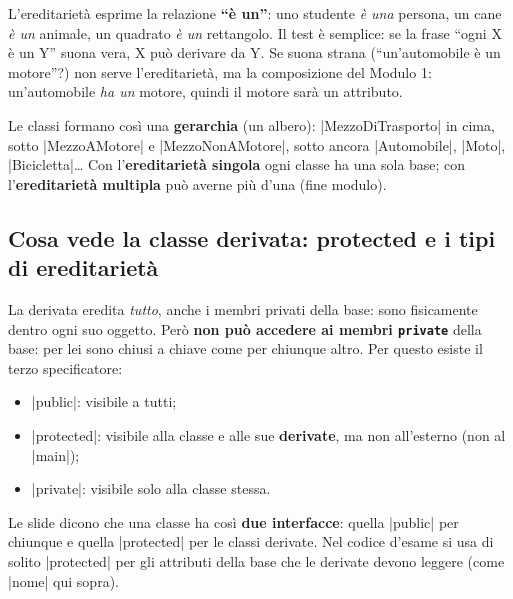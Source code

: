 \begin{analogia}[: la relazione ``è un'']
L'ereditarietà esprime la relazione \textbf{``è un''}: uno studente \emph{è una}
persona, un cane \emph{è un} animale, un quadrato \emph{è un} rettangolo. Il test
è semplice: se la frase ``ogni X è un Y'' suona vera, X può derivare da Y. Se suona
strana (``un'automobile è un motore''?) non serve l'ereditarietà, ma la composizione
del Modulo 1: un'automobile \emph{ha un} motore, quindi il motore sarà un attributo.
\end{analogia}

Le classi formano così una \textbf{gerarchia} (un albero): \cc|MezzoDiTrasporto| in
cima, sotto \cc|MezzoAMotore| e \cc|MezzoNonAMotore|, sotto ancora \cc|Automobile|,
\cc|Moto|, \cc|Bicicletta|\ldots{} Con l'\textbf{ereditarietà singola} ogni classe ha
una sola base; con l'\textbf{ereditarietà multipla} può averne più d'una (fine modulo).

\subsection*{Cosa vede la classe derivata: protected e i tipi di ereditarietà}

La derivata eredita \emph{tutto}, anche i membri privati della base: sono fisicamente
dentro ogni suo oggetto. Però \textbf{non può accedere ai membri \texttt{private}}
della base: per lei sono chiusi a chiave come per chiunque altro. Per questo esiste il
terzo specificatore:
\begin{itemize}
  \item \cc|public|: visibile a tutti;
  \item \cc|protected|: visibile alla classe e alle sue \textbf{derivate}, ma non
        all'esterno (non al \cc|main|);
  \item \cc|private|: visibile solo alla classe stessa.
\end{itemize}
Le slide dicono che una classe ha così \textbf{due interfacce}: quella
\cc|public| per chiunque e quella \cc|protected| per le classi derivate. Nel codice
d'esame si usa di solito \cc|protected| per gli attributi della base che le
derivate devono leggere (come \cc|nome| qui sopra).

